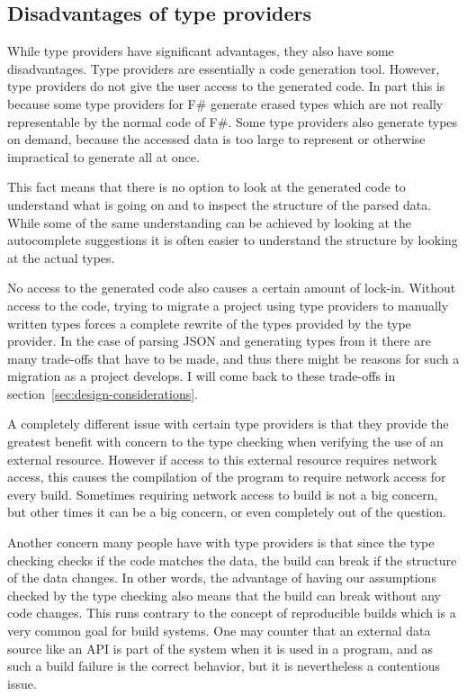 \subsection{Disadvantages of type providers}
\label{sec:disadvantages-of-type-providers}

While type providers have significant advantages, they also have some disadvantages. Type providers are essentially a code generation tool. However, type providers do not give the user access to the generated code. In part this is because some type providers for F\# generate erased types which are not really representable by the normal code of F\#. Some type providers also generate types on demand, because the accessed data is too large to represent or otherwise impractical to generate all at once.


This fact means that there is no option to look at the generated code to understand what is going on and to inspect the structure of the parsed data. While some of the same understanding can be achieved by looking at the autocomplete suggestions it is often easier to understand the structure by looking at the actual types.


No access to the generated code also causes a certain amount of lock-in. Without access to the code, trying to migrate a project using type providers to manually written types forces a complete rewrite of the types provided by the type provider. In the case of parsing JSON and generating types from it there are many trade-offs that have to be made, and thus there might be reasons for such a migration as a project develops. I will come back to these trade-offs in section~\ref{sec:design-considerations}.


A completely different issue with certain type providers is that they provide the greatest benefit with concern to the type checking when verifying the use of an external resource. However if access to this external resource requires network access, this causes the compilation of the program to require network access for every build. Sometimes requiring network access to build is not a big concern, but other times it can be a big concern, or even completely out of the question.

Another concern many people have with type providers is that since the type checking checks if the code matches the data, the build can break if the structure of the data changes. In other words, the advantage of having our assumptions checked by the type checking also means that the build can break without any code changes. This runs contrary to the concept of reproducible builds which is a very common goal for build systems. One may counter that an external data source like an API is part of the system when it is used in a program, and as such a build failure is the correct behavior, but it is nevertheless a contentious issue.

